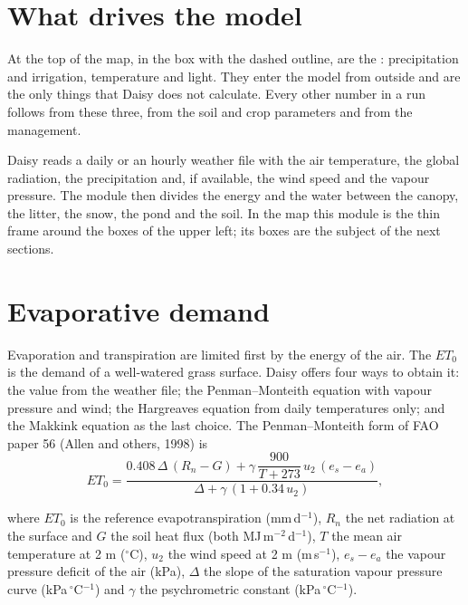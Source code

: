 \label{ch:map-weather}
\section{What drives the model}
At the top of the map, in the box with the dashed outline, are the : precipitation and irrigation, temperature and light. They enter the model from outside and are the only things that Daisy does not calculate. Every other number in a run follows from these three, from the soil and crop parameters and from the management.

\par\noindent Daisy reads a daily or an hourly weather file with the air temperature, the global radiation, the precipitation and, if available, the wind speed and the vapour pressure. The  module then divides the energy and the water between the canopy, the litter, the snow, the pond and the soil. In the map this module is the thin frame around the boxes of the upper left; its boxes are the subject of the next sections.

\section{Evaporative demand}
Evaporation and transpiration are limited first by the energy of the air. The  $ET_0$ is the demand of a well-watered grass surface. Daisy offers four ways to obtain it: the value from the weather file; the Penman--Monteith equation with vapour pressure and wind; the Hargreaves equation from daily temperatures only; and the Makkink equation as the last choice. The Penman--Monteith form of FAO paper 56 (Allen and others, 1998) is
\begin{equation}\label{eq:dm-pm}\boxed{ET_0=\frac{0.408\,\Delta\,(R_n-G)+\gamma\,\dfrac{900}{T+273}\,u_2\,(e_s-e_a)}{\Delta+\gamma\,(1+0.34\,u_2)} ,}\end{equation}
\par\noindent where $ET_0$ is the reference evapotranspiration (mm\,d$^{-1}$), $R_n$ the net radiation at the surface and $G$ the soil heat flux (both MJ\,m$^{-2}$\,d$^{-1}$), $T$ the mean air temperature at 2 m ($^\circ$C), $u_2$ the wind speed at 2 m (m\,s$^{-1}$), $e_s-e_a$ the vapour pressure deficit of the air (kPa), $\Delta$ the slope of the saturation vapour pressure curve (kPa\,$^\circ$C$^{-1}$) and $\gamma$ the psychrometric constant (kPa\,$^\circ$C$^{-1}$).

